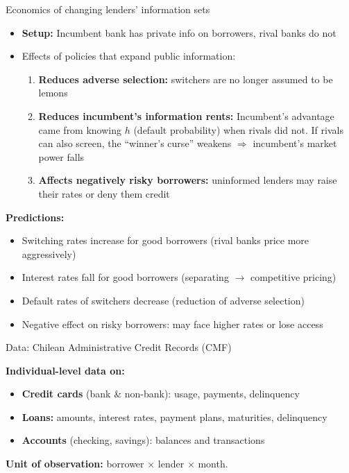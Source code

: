 \documentclass[10pt,aspectratio=169]{beamer}
\begin{document}
\begin{frame}{Economics of changing lenders' information sets }
\begin{itemize}
    \item \textbf{Setup:} Incumbent bank has private info on borrowers, rival banks do not
    \item Effects of policies that expand public information:
    \begin{enumerate}
        \item \textbf{Reduces adverse selection:} switchers are no longer assumed to be lemons 
        \item \textbf{Reduces incumbent's information rents:} Incumbent's advantage came from knowing $h$ (default probability) when rivals did not. If rivals can also screen, the ``winner's curse'' weakens $\Rightarrow$ incumbent's market power falls
        \item \textbf{Affects negatively risky borrowers:} uninformed lenders may raise their rates or deny them credit
    \end{enumerate}
\end{itemize}
\textbf{Predictions:}
\begin{itemize}
    \item[P1.] Switching rates increase for good borrowers (rival banks price more aggressively)
    \item[P2.] Interest rates fall for good borrowers (separating $\to$ competitive pricing)
    \item[P3.] Default rates of switchers decrease  (reduction of adverse selection) 
    \item[P4.] Negative effect on risky borrowers: may face higher rates or lose access
\end{itemize}
\end{frame}




\begin{frame}{Data: Chilean Administrative Credit Records (CMF)}

\vspace{0.3cm}
\textbf{Individual-level data on:}
\begin{itemize}
    \item \textbf{Credit cards} (bank \& non-bank): usage, payments, delinquency
    \item \textbf{Loans:} amounts, interest rates, payment plans, maturities, delinquency
    \item \textbf{Accounts} (checking, savings): balances and transactions
\end{itemize}

\textbf{Unit of observation:} borrower $\times$ lender $\times$ month.
\end{frame}
\end{document}
